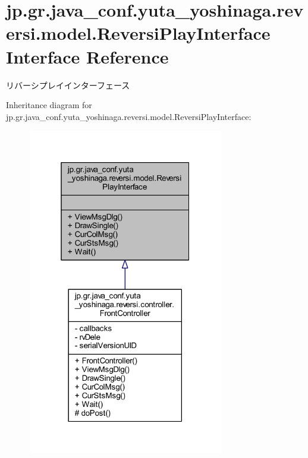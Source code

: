 \hypertarget{interfacejp_1_1gr_1_1java__conf_1_1yuta__yoshinaga_1_1reversi_1_1model_1_1_reversi_play_interface}{}\section{jp.\+gr.\+java\+\_\+conf.\+yuta\+\_\+yoshinaga.\+reversi.\+model.\+Reversi\+Play\+Interface Interface Reference}
\label{interfacejp_1_1gr_1_1java__conf_1_1yuta__yoshinaga_1_1reversi_1_1model_1_1_reversi_play_interface}


リバーシプレイインターフェース  




Inheritance diagram for jp.\+gr.\+java\+\_\+conf.\+yuta\+\_\+yoshinaga.\+reversi.\+model.\+Reversi\+Play\+Interface\+:\nopagebreak
\begin{figure}[H]
\begin{center}
\leavevmode
\includegraphics[width=241pt]{interfacejp_1_1gr_1_1java__conf_1_1yuta__yoshinaga_1_1reversi_1_1model_1_1_reversi_play_interface__inherit__graph}
\end{center}
\end{figure}


